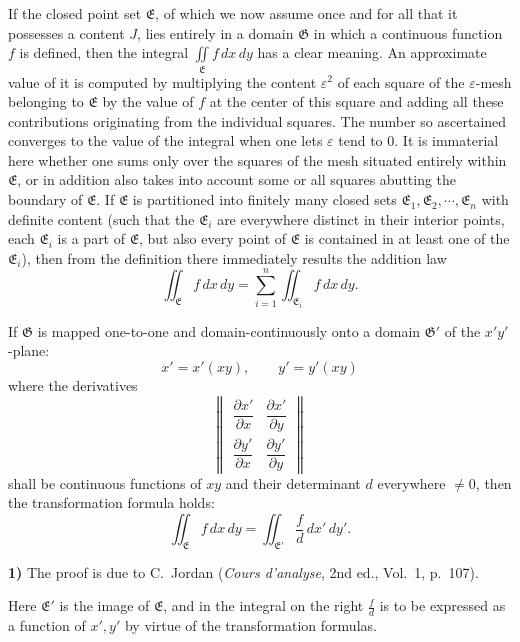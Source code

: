 \documentclass{article}
\begin{document}
If the closed point set $\mathfrak{E}$, of which we now assume once and for all that it possesses a content $J$, lies entirely in a domain $\mathfrak{G}$ in which a continuous function $f$ is defined, then the integral $\displaystyle\iint\limits_{\mathfrak{E}} f\,dx\,dy$ has a clear meaning. An approximate value of it is computed by multiplying the content $\varepsilon^2$ of each square of the $\varepsilon$-mesh belonging to $\mathfrak{E}$ by the value of $f$ at the center of this square and adding all these contributions originating from the individual squares. The number so ascertained converges to the value of the integral when one lets $\varepsilon$ tend to $0$. It is immaterial here whether one sums only over the squares of the mesh situated entirely within $\mathfrak{E}$, or in addition also takes into account some or all squares abutting the boundary of $\mathfrak{E}$. If $\mathfrak{E}$ is partitioned into finitely many closed sets $\mathfrak{E}_1, \mathfrak{E}_2, \cdots, \mathfrak{E}_n$ with definite content (such that the $\mathfrak{E}_i$ are everywhere distinct in their interior points, each $\mathfrak{E}_i$ is a part of $\mathfrak{E}$, but also every point of $\mathfrak{E}$ is contained in at least one of the $\mathfrak{E}_i$), then from the definition there immediately results the addition law
\[ \iint_{\mathfrak{E}} f\,dx\,dy = \sum_{i=1}^n \iint_{\mathfrak{E}_i} f\,dx\,dy. \]

If $\mathfrak{G}$ is mapped one-to-one and domain-continuously onto a domain $\mathfrak{G}'$ of the $x'y'$-plane:
\[ x' = x'(xy), \qquad y' = y'(xy) \tag{14} \]
where the derivatives
\[ \begin{Vmatrix} \dfrac{\partial x'}{\partial x} & \dfrac{\partial x'}{\partial y} \\[1ex] \dfrac{\partial y'}{\partial x} & \dfrac{\partial y'}{\partial y} \end{Vmatrix} \]
shall be continuous functions of $xy$ and their determinant $d$ everywhere $\neq 0$, then the transformation formula holds:
\[ \iint_{\mathfrak{E}} f\,dx\,dy = \iint_{\mathfrak{E}'} \frac{f}{d}\,dx'\,dy'. \]

\textbf{1)} The proof is due to C.~Jordan (\emph{Cours d'analyse}, 2nd ed., Vol.~1, p.~107).

Here $\mathfrak{E}'$ is the image of $\mathfrak{E}$, and in the integral on the right $\frac{f}{d}$ is to be expressed as a function of $x', y'$ by virtue of the transformation formulas.
\end{document}
